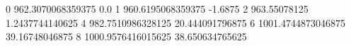0 962.3070068359375 0.0
1 960.6195068359375 -1.6875
2 963.55078125 1.2437744140625
4 982.7510986328125 20.444091796875
6 1001.4744873046875 39.16748046875
8 1000.9576416015625 38.650634765625
